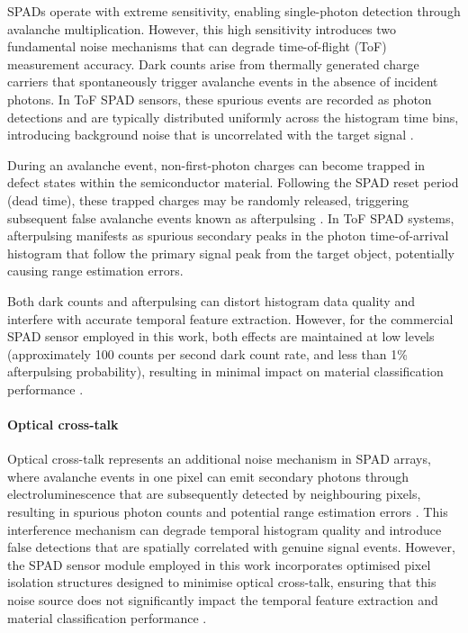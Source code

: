 \documentclass[12pt,a4paper,oneside]{report}
\begin{document}
SPADs operate with extreme sensitivity, enabling single-photon detection through avalanche multiplication. However, this high sensitivity introduces two fundamental noise mechanisms that can degrade time-of-flight (ToF) measurement accuracy. Dark counts arise from thermally generated charge carriers that spontaneously trigger avalanche events in the absence of incident photons. In ToF SPAD sensors, these spurious events are recorded as photon detections and are typically distributed uniformly across the histogram time bins, introducing background noise that is uncorrelated with the target signal \cite{piron2020}.

During an avalanche event, non-first-photon charges can become trapped in defect states within the semiconductor material. Following the SPAD reset period (dead time), these trapped charges may be randomly released, triggering subsequent false avalanche events known as afterpulsing \cite{piron2020}. In ToF SPAD systems, afterpulsing manifests as spurious secondary peaks in the photon time-of-arrival histogram that follow the primary signal peak from the target object, potentially causing range estimation errors.

Both dark counts and afterpulsing can distort histogram data quality and interfere with accurate temporal feature extraction. However, for the commercial SPAD sensor employed in this work, both effects are maintained at low levels (approximately 100 counts per second dark count rate, and less than 1\% afterpulsing probability), resulting in minimal impact on material classification performance \cite{piron2020}.

\paragraph{Optical cross-talk}
\label{par:optical_cross_talk}

Optical cross-talk represents an additional noise mechanism in SPAD arrays, where avalanche events in one pixel can emit secondary photons through electroluminescence that are subsequently detected by neighbouring pixels, resulting in spurious photon counts and potential range estimation errors \cite{piron2020}. This interference mechanism can degrade temporal histogram quality and introduce false detections that are spatially correlated with genuine signal events. However, the SPAD sensor module employed in this work incorporates optimised pixel isolation structures designed to minimise optical cross-talk, ensuring that this noise source does not significantly impact the temporal feature extraction and material classification performance .
\end{document}
